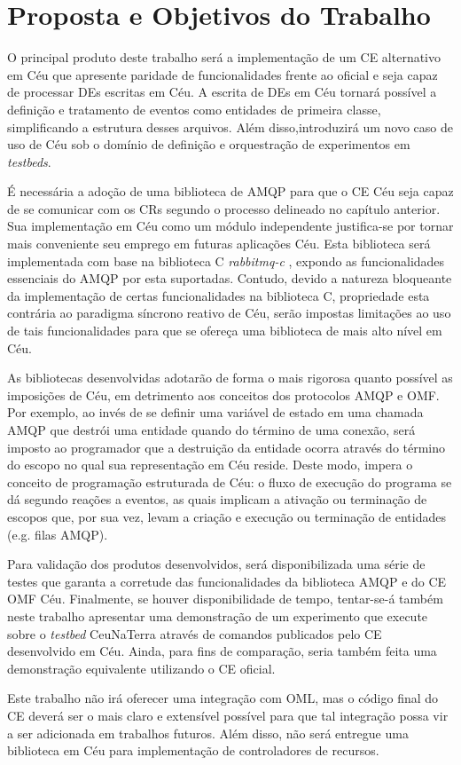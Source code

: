 
\chapter{Proposta e Objetivos do Trabalho}

O principal produto deste trabalho ser\'a a implementa\c{c}\~ao de um CE alternativo em C\'eu que apresente paridade de funcionalidades frente ao oficial e seja capaz de processar DEs escritas em C\'eu. A escrita de DEs em C\'eu tornar\'a poss\'ivel a defini\c{c}\~ao e tratamento de eventos como entidades de primeira classe, simplificando a estrutura desses arquivos. Al\'em disso,introduzir\'a um novo caso de uso de C\'eu sob o dom\'inio de defini\c{c}\~ao e orquestra\c{c}\~ao de experimentos em \textit{testbeds}. 

\'E necess\'aria a ado\c{c}\~ao de uma biblioteca de AMQP para que o CE C\'eu seja capaz de se comunicar com os CRs segundo o processo delineado no cap\'itulo anterior. Sua implementa\c{c}\~ao em C\'eu como um m\'odulo independente justifica-se por tornar mais conveniente seu emprego em futuras aplica\c{c}\~oes C\'eu. Esta biblioteca ser\'a implementada com base na biblioteca C \textit{rabbitmq-c} \cite{rabbitmq.c}, expondo as funcionalidades essenciais do AMQP por esta suportadas. Contudo, devido a natureza bloqueante da implementa\c{c}\~ao de certas funcionalidades na biblioteca C, propriedade esta contr\'aria ao paradigma s\'incrono reativo de C\'eu, ser\~ao impostas limita\c{c}\~oes ao uso de tais funcionalidades para que se ofere\c{c}a uma biblioteca de mais alto n\'ivel em C\'eu.

As bibliotecas desenvolvidas adotarão de forma o mais rigorosa quanto possível as imposições de Céu, em detrimento aos conceitos dos protocolos AMQP e OMF. Por exemplo, ao invés de se definir uma variável de estado em uma chamada AMQP que destrói uma entidade quando do término de uma conexão, será imposto ao programador que a destruição da entidade ocorra através do término do escopo no qual sua representação em Céu reside. Deste modo, impera o conceito de programação estruturada de Céu: o fluxo de execução do programa se dá segundo reações a eventos, as quais implicam a ativação ou terminação de escopos que, por sua vez, levam a criação e execução ou terminação de entidades (e.g. filas AMQP).

Para valida\c{c}\~ao dos produtos desenvolvidos, ser\'a disponibilizada uma s\'erie de testes que garanta a corretude das funcionalidades da biblioteca AMQP e do CE OMF C\'eu. Finalmente, se houver disponibilidade de tempo, tentar-se-á também neste trabalho apresentar uma demonstração de um experimento que execute sobre o \textit{testbed} CeuNaTerra atrav\'es de comandos publicados pelo CE desenvolvido em C\'eu. Ainda, para fins de comparaç\~ao, seria tamb\'em feita uma demonstra\c{c}\~ao equivalente utilizando o CE oficial.

Este trabalho n\~ao ir\'a oferecer uma integra\c{c}\~ao com OML, mas o c\'odigo final do CE dever\'a ser o mais claro e extens\'ivel poss\'ivel para que tal integra\c{c}\~ao possa vir a ser adicionada em trabalhos futuros. Al\'em disso, n\~ao ser\'a entregue uma biblioteca em C\'eu para implementa\c{c}\~ao de controladores de recursos.
